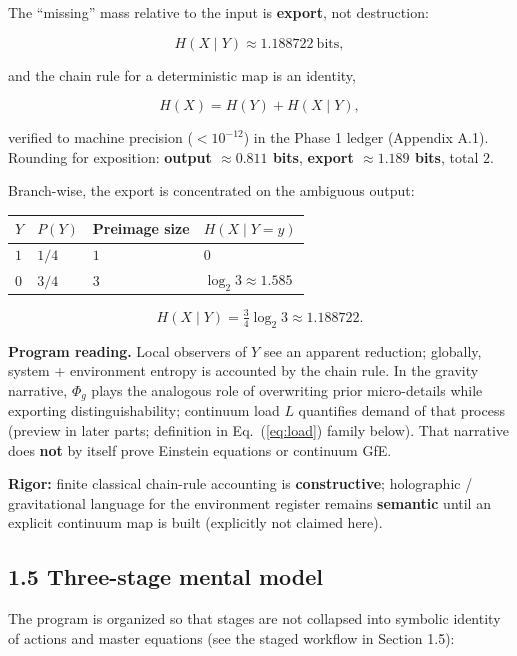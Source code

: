 \documentclass[
  11pt,
]{article}
\newcounter{none} %
\begin{document}
The ``missing'' mass relative to the input is \textbf{export}, not
destruction:

\[
H(X\mid Y)\approx 1.188722\ \mathrm{bits},
\]

and the chain rule for a deterministic map is an identity,

\[
H(X)=H(Y)+H(X\mid Y),
\]

verified to machine precision (\(<10^{-12}\)) in the Phase 1 ledger
(Appendix A.1). Rounding for exposition: \textbf{output
\(\approx 0.811\) bits}, \textbf{export \(\approx 1.189\) bits}, total
\(2\).

Branch-wise, the export is concentrated on the ambiguous output:

{\def\LTcaptype{none} %
\begin{longtable}[]{@{}llll@{}}
\toprule\noalign{}
\(Y\) & \(P(Y)\) & Preimage size & \(H(X\mid Y=y)\) \\
\midrule\noalign{}
\endhead
\bottomrule\noalign{}
\endlastfoot
\(1\) & \(1/4\) & \(1\) & \(0\) \\
\(0\) & \(3/4\) & \(3\) & \(\log_2 3\approx 1.585\) \\
\end{longtable}
}

\[
H(X\mid Y)=\tfrac34\log_2 3\approx 1.188722.
\]

\textbf{Program reading.} Local observers of \(Y\) see an apparent
reduction; globally, system + environment entropy is accounted by the
chain rule. In the gravity narrative, \(\Phi_g\) plays the analogous
role of overwriting prior micro-details while exporting
distinguishability; continuum load \(L\) quantifies demand of that
process (preview in later parts; definition in Eq.~(\ref{eq:load})
family below). That narrative does \textbf{not} by itself prove Einstein
equations or continuum GfE.

\textbf{Rigor:} finite classical chain-rule accounting is
\textbf{constructive}; holographic / gravitational language for the
environment register remains \textbf{semantic} until an explicit
continuum map is built (explicitly not claimed here).

\subsection{1.5 Three-stage mental
model}\label{three-stage-mental-model}

The program is organized so that stages are not collapsed into symbolic
identity of actions and master equations (see the staged workflow in
Section 1.5):
\end{document}
